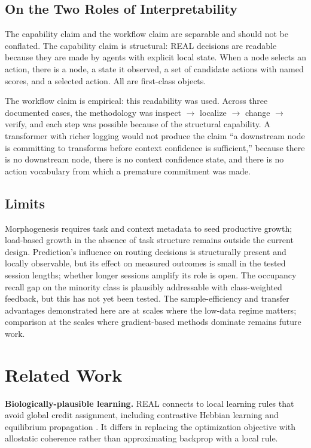 \documentclass[letterpaper]{article}
\begin{document}
\subsection{On the Two Roles of Interpretability}

The capability claim and the workflow claim are separable and should not be
conflated. The capability claim is structural: REAL decisions are readable because
they are made by agents with explicit local state. When a node selects an action,
there is a node, a state it observed, a set of candidate actions with named scores,
and a selected action. All are first-class objects.

The workflow claim is empirical: this readability was used. Across three documented
cases, the methodology was inspect $\to$ localize $\to$ change $\to$ verify, and
each step was possible because of the structural capability. A transformer with
richer logging would not produce the claim ``a downstream node is committing to
transforms before context confidence is sufficient,'' because there is no
downstream node, there is no context confidence state, and there is no action
vocabulary from which a premature commitment was made.

\subsection{Limits}

Morphogenesis requires task and context metadata to seed productive growth;
load-based growth in the absence of task structure remains outside the current
design. Prediction's influence on routing decisions is structurally present and
locally observable, but its effect on measured outcomes is small in the tested
session lengths; whether longer sessions amplify its role is open. The occupancy
recall gap on the minority class is plausibly addressable with class-weighted
feedback, but this has not yet been tested. The sample-efficiency and transfer
advantages demonstrated here are at scales where the low-data regime matters;
comparison at the scales where gradient-based methods dominate remains future work.

\section{Related Work}

\textbf{Biologically-plausible learning.} REAL connects to local learning rules
that avoid global credit assignment, including contrastive Hebbian learning
\citep{movellan1991contrastive} and equilibrium propagation
\citep{scellier2017equilibrium}. It differs in replacing the optimization objective
with allostatic coherence rather than approximating backprop with a local rule.
\end{document}
